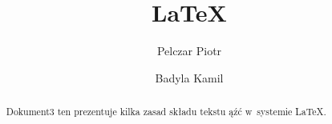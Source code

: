 \documentclass[11pt,a4paper]{article}
\title{\LaTeX}
\author{
  Pelczar Piotr\\
  \and
  Badyla Kamil\\
}
\date{}
\begin{document}
\maketitle 

\begin{abstract} 
Dokument3 ten prezentuje kilka zasad składu tekstu ąźć
w~systemie \LaTeX. 
\end{abstract} 

\tableofcontents
\listoffigures
\listoftables


\end{document}
